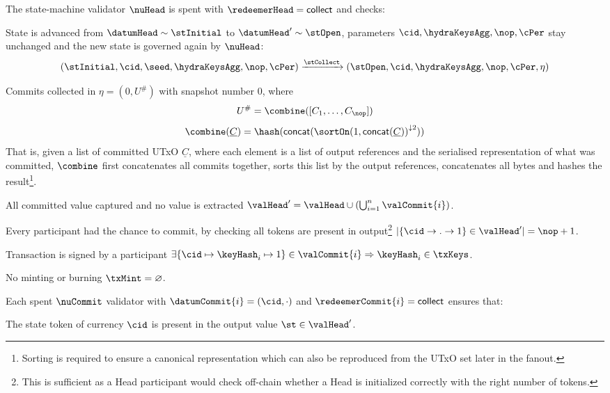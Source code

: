 \noindent The state-machine validator $\nuHead$ is spent with
$\redeemerHead = \mathsf{collect}$ and checks:
\begin{menumerate}
	\item State is advanced from $\datumHead \sim \stInitial$ to
	$\datumHead' \sim \stOpen$, parameters $\cid,\hydraKeysAgg,\nop,\cPer$ stay
	unchanged and the new state is governed again by $\nuHead$:
	\[
		(\stInitial,\cid,\seed,\hydraKeysAgg,\nop,\cPer) \xrightarrow{\stCollect} (\stOpen,\cid,\hydraKeysAgg,\nop,\cPer,\eta)
	\]
	\item Commits collected in $\eta = (0, U^{\#})$ with snapshot number $0$,
	where
	\[
		U^{\#} = \combine([C_{1}, \dots, C_{\nop}])
	\]
	\[
		\combine(\underline{C}) = \hash(\mathsf{concat}({\sortOn(1, \mathsf{concat}(\underline{C}))}^{\downarrow2}))
	\]
	That is, given a list of committed UTxO $\underline{C}$, where each element is
	a list of output references and the serialised representation of what was
	committed, $\combine$ first concatenates all commits together, sorts this list
	by the output references, concatenates all bytes and hashes the
	result\footnote{Sorting is required to ensure a canonical representation which
		can also be reproduced from the UTxO set later in the fanout.}.

	\item All committed value captured and no value is extracted
	$\valHead' = \valHead \cup (\bigcup_{i=1}^{n} \valCommit{i})$.
	\item Every participant had the chance to commit, by checking all tokens are
	present in output\footnote{This is sufficient as a Head participant would
		check off-chain whether a Head is initialized correctly with the right
		number of tokens.}
	$|\{\cid \rightarrow . \rightarrow 1\} \in \valHead'| = \nop + 1$.
	\item Transaction is signed by a participant $\exists \{\cid \mapsto \keyHash_{i} \mapsto 1\} \in \valCommit{i} \Rightarrow \keyHash_{i} \in \txKeys$.
	\item No minting or burning  $\txMint = \varnothing$.
\end{menumerate}

\noindent Each spent $\nuCommit$ validator with $\datumCommit{i} = (\cid,\cdot)$ and $\redeemerCommit{i} = \mathsf{collect}$ ensures that:
\begin{menumerate}
	\item The state token of currency $\cid$ is present in the output value
	$\st \in \valHead'$.
\end{menumerate}

